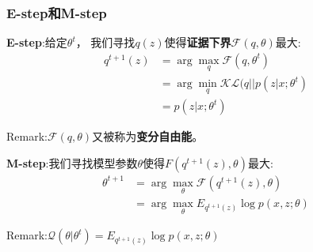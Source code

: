 \documentclass[UTF8]{ctexart}
\begin{document}
\subsubsection{E-step和M-step}

\textbf{E-step}:给定$\theta^{t}$， 我们寻找$q(z)$使得\textbf{证据下界}$\mathcal{F}(q,\theta)$最大:
\begin{align*}
    q^{t+1}(z) &= \arg\max\limits_{q}\mathcal{F}(q,\theta^t) \\
    &=\arg\min\limits_{q}\mathcal{KL}(q||p(z|x;\theta^t)  \\
    &= p(z|x;\theta^t) \tag{13}
\end{align*}

Remark:$\mathcal{F}(q,\theta)$又被称为\textbf{变分自由能}。

\textbf{M-step}:我们寻找模型参数$\theta$使得$F(q^{t+1}(z),\theta)$最大:
\begin{align*}
    \theta^{t+1} &= \arg\max\limits_{\theta}\mathcal{F}(q^{t+1}(z),\theta) \\
    &= \arg\max\limits_{\theta} E_{q^{t+1}(z)}\log p(x,z;\theta) \tag{14}
\end{align*}

Remark:$\mathcal{Q}(\theta|\theta^t) = E_{q^{t+1}(z)}\log p(x,z;\theta)$
\end{document}
